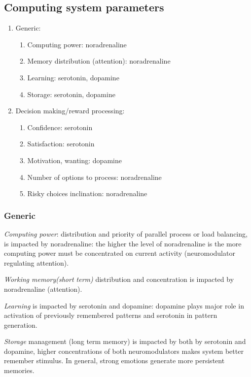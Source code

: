 \subsection{Computing system parameters}

\begin{enumerate}
 \item  Generic:
 \begin{enumerate}
  \item  Computing power: noradrenaline
  \item  Memory distribution (attention): noradrenaline
  \item  Learning: serotonin, dopamine
  \item  Storage: serotonin, dopamine
 \end{enumerate}
 \item  Decision making/reward processing:
 \begin{enumerate}
  \item  Confidence: serotonin
  \item  Satisfaction: serotonin
  \item  Motivation, wanting: dopamine
  \item  Number of options to process: noradrenaline
  \item  Risky choices inclination: noradrenaline
 \end{enumerate}
\end{enumerate}

\subsubsection{Generic}

\emph{Computing power}: distribution and priority of parallel process or load balancing, is impacted by noradrenaline: the higher the level of noradrenaline is the more computing power must be concentrated on current activity (neuromodulator regulating attention).

\emph{Working memory(short term)} distribution and concentration is impacted by noradrenaline (attention).

\emph{Learning} is impacted by serotonin and dopamine: dopamine plays major role in activation of previously remembered patterns and serotonin in pattern generation.

\emph{Storage} management (long term memory) is impacted by both by serotonin and dopamine, higher concentrations of both neuromodulators makes system better remember stimulus. In general, strong emotions generate more persistent memories.

